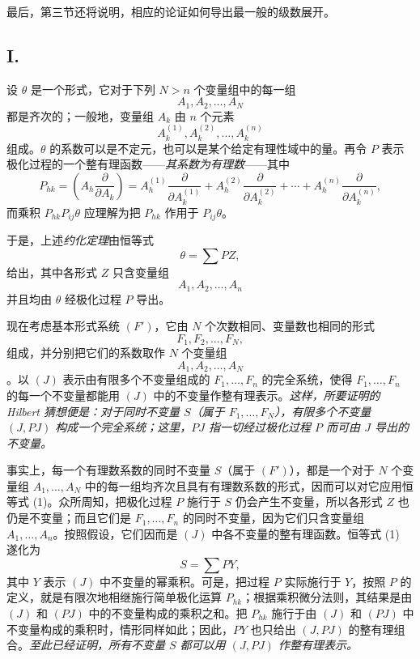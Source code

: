 最后，第三节还将说明，相应的论证如何导出最一般的级数展开。

\subsection*{I.}
设 $\theta$ 是一个形式，它对于下列 $N>n$ 个变量组中的每一组
\[
  A_1,A_2,\ldots,A_N
\]
都是齐次的；一般地，变量组 $A_k$ 由 $n$ 个元素
\[
  A_k^{(1)},A_k^{(2)},\ldots,A_k^{(n)}
\]
组成。$\theta$ 的系数可以是不定元，也可以是某个给定有理性域中的量。再令 $P$ 表示极化过程的一个整有理函数——\emph{其系数为有理数}——其中
\[
  P_{hk}=\left(A_h\frac{\partial}{\partial A_k}\right)
  =A_h^{(1)}\frac{\partial}{\partial A_k^{(1)}}+
   A_h^{(2)}\frac{\partial}{\partial A_k^{(2)}}+
   \cdots+
   A_h^{(n)}\frac{\partial}{\partial A_k^{(n)}},
\]
而乘积 $P_{hk}P_{ij}\theta$ 应理解为把 $P_{hk}$ 作用于 $P_{ij}\theta$。

于是，上述\emph{约化定理}由恒等式
\begin{equation}
  \theta=\sum PZ,
\tag{1}
\end{equation}
给出，其中各形式 $Z$ 只含变量组
\[
  A_1,A_2,\ldots,A_n
\]
并且均由 $\theta$ 经极化过程 $P$ 导出。

现在考虑基本形式系统 $(F')$，它由 $N$ 个次数相同、变量数也相同的形式
\[
  F_1,F_2,\ldots,F_N,
\]
组成，并分别把它们的系数取作 $N$ 个变量组
\[
  A_1,A_2,\ldots,A_N
\]
。以 $(J)$ 表示由有限多个不变量组成的 $F_1,\ldots,F_n$ 的完全系统，使得 $F_1,\ldots,F_n$ 的每一个不变量都能用 $(J)$ 中的不变量作整有理表示。\emph{这样，所要证明的 Hilbert 猜想便是：对于同时不变量 $S$（属于 $F_1,\ldots,F_N$），有限多个不变量 $(J,PJ)$ 构成一个完全系统；这里，$PJ$ 指一切经过极化过程 $P$ 而可由 $J$ 导出的不变量。}

事实上，每一个有理数系数的同时不变量 $S$（属于 $(F')$），都是一个对于 $N$ 个变量组 $A_1,\ldots,A_N$ 中的每一组均齐次且具有有理数系数的形式，因而可以对它应用恒等式 (1)。众所周知，把极化过程 $P$ 施行于 $S$ 仍会产生不变量，所以各形式 $Z$ 也仍是不变量；而且它们是 $F_1,
\ldots,F_n$ 的同时不变量，因为它们只含变量组 $A_1,
\ldots,A_n$。按照假设，它们因而是 $(J)$ 中各不变量的整有理函数。恒等式 (1) 遂化为
\[
  S=\sum PY,
\]
其中 $Y$ 表示 $(J)$ 中不变量的幂乘积。可是，把过程 $P$ 实际施行于 $Y$，按照 $P$ 的定义，就是有限次地相继施行简单极化运算 $P_{hk}$；根据乘积微分法则，其结果是由 $(J)$ 和 $(PJ)$ 中的不变量构成的乘积之和。把 $P_{hk}$ 施行于由 $(J)$ 和 $(PJ)$ 中不变量构成的乘积时，情形同样如此；因此，$PY$ 也只给出 $(J,PJ)$ 的整有理组合。\emph{至此已经证明，所有不变量 $S$ 都可以用 $(J,PJ)$ 作整有理表示。}

